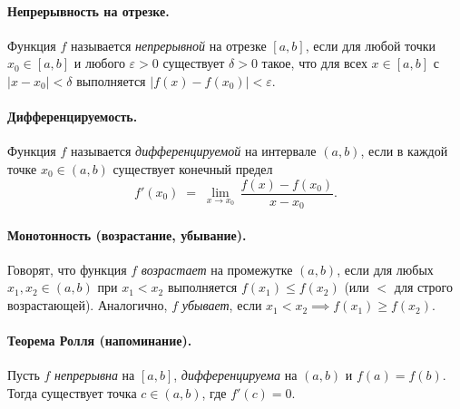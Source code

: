 
\paragraph{Непрерывность на отрезке.}
Функция $f$ называется \emph{непрерывной} на отрезке $[a,b]$,
если для любой точки $x_0 \in [a,b]$ и любого $\varepsilon>0$ существует
$\delta>0$ такое, что для всех $x \in [a,b]$ с $|x - x_0| < \delta$ выполняется
$|f(x) - f(x_0)| < \varepsilon$.

\paragraph{Дифференцируемость.}
Функция $f$ называется \emph{дифференцируемой} на интервале $(a,b)$,
если в каждой точке $x_0 \in (a,b)$ существует конечный предел
\[
	f'(x_0) \;=\; \lim_{x \to x_0}\,\frac{f(x) - f(x_0)}{\,x - x_0\,}.
\]

\paragraph{Монотонность (возрастание, убывание).}
Говорят, что функция $f$ \emph{возрастает} на промежутке $(a,b)$,
если для любых $x_1, x_2 \in (a,b)$ при $x_1 < x_2$ выполняется
$f(x_1) \le f(x_2)$ (или $<$ для строго возрастающей).
Аналогично, $f$ \emph{убывает}, если $x_1 < x_2 \implies f(x_1) \ge f(x_2)$.

\paragraph{Теорема Ролля (напоминание).}
Пусть $f$ \emph{непрерывна} на $[a,b]$, \emph{дифференцируема} на $(a,b)$ и
$f(a)=f(b)$. Тогда существует точка $c\in(a,b)$, где $f'(c)=0$.

\bigskip



